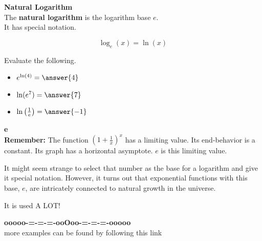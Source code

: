 \documentclass{ximera}
\begin{document}
\begin{definition} \textbf{\textcolor{green!50!black}{Natural Logarithm}}   \\


The \textbf{natural logarithm} is the logarithm base $e$.  \\

It has special notation.

\[
\log_e(x) = \ln(x)
\]

\end{definition}



\begin{question}


Evaluate the following.

\begin{itemize}
\item $e^{\ln(4)} = \answer{4}$ 
\item $\ln(e^7) = \answer{7}$
\item $\ln\left( \frac{1}{e} \right) = \answer{-1}$
\end{itemize}



\end{question}



\begin{remark} \textbf{\textcolor{purple!85!blue}{e}} \\

\textbf{\textcolor{blue!55!black}{Remember:}} The function $\left( 1 + \frac{1}{x}  \right)^{x}$ has a limiting value.  Its end-behavior is a constant.  Its graph has a horizontal asymptote.  $e$ is this limiting value.

It might seem strange to select that number as the base for a logarithm and give it special notation.  However, it turns out that exponential functions with this base, $e$, are intricately connected to natural growth in the universe.

It is used A LOT!
\end{remark}










\begin{center}
\textbf{\textcolor{green!50!black}{ooooo-=-=-=-ooOoo-=-=-=-ooooo}} \\

more examples can be found by following this link\\ 

\end{center}
\end{document}
